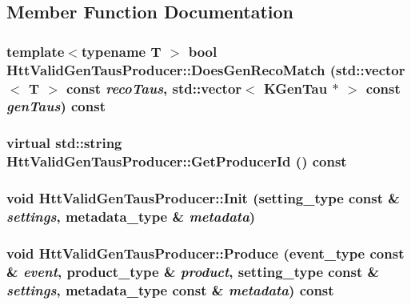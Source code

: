 \subsection{Member Function Documentation}
\hypertarget{classHttValidGenTausProducer_ad9d81a059b84528426662ca8ae4e3004}{
\subsubsection[{DoesGenRecoMatch}]{\setlength{\rightskip}{0pt plus 5cm}template$<$typename T $>$ bool HttValidGenTausProducer::DoesGenRecoMatch (std::vector$<$ T $>$ const  {\em recoTaus}, \/  std::vector$<$ KGenTau $\ast$ $>$ const  {\em genTaus}) const}}
\label{classHttValidGenTausProducer_ad9d81a059b84528426662ca8ae4e3004}
\hypertarget{classHttValidGenTausProducer_a0be418bae888b7e587bac2e9495fc8e3}{
\subsubsection[{GetProducerId}]{\setlength{\rightskip}{0pt plus 5cm}virtual std::string HttValidGenTausProducer::GetProducerId () const}}
\label{classHttValidGenTausProducer_a0be418bae888b7e587bac2e9495fc8e3}
\hypertarget{classHttValidGenTausProducer_a6e957528afb4f7fd4386dbd569e53511}{
\subsubsection[{Init}]{\setlength{\rightskip}{0pt plus 5cm}void HttValidGenTausProducer::Init (setting\_\-type const \& {\em settings}, \/  metadata\_\-type \& {\em metadata})}}
\label{classHttValidGenTausProducer_a6e957528afb4f7fd4386dbd569e53511}
\hypertarget{classHttValidGenTausProducer_aeb0a9951a851631d5de44d614ed7fdb2}{
\subsubsection[{Produce}]{\setlength{\rightskip}{0pt plus 5cm}void HttValidGenTausProducer::Produce (event\_\-type const \& {\em event}, \/  product\_\-type \& {\em product}, \/  setting\_\-type const \& {\em settings}, \/  metadata\_\-type const \& {\em metadata}) const}}
\label{classHttValidGenTausProducer_aeb0a9951a851631d5de44d614ed7fdb2}


